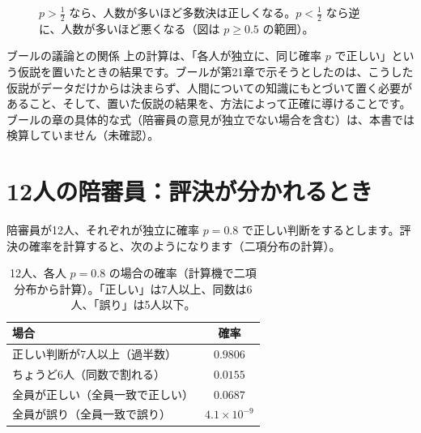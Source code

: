\documentclass[a4paper,11pt,openany]{ltjsbook}
\begin{document}
\begin{figure}[htbp]
\centering
{}
\caption{$p>\tfrac12$ なら、人数が多いほど多数決は正しくなる。$p<\tfrac12$ なら逆に、人数が多いほど悪くなる（図は $p\ge0.5$ の範囲）。}
\end{figure}

\begin{notebox}{ブールの議論との関係}
上の計算は、「各人が独立に、同じ確率 $p$ で正しい」という仮説を置いたときの結果です。ブールが第21章で示そうとしたのは、こうした仮説がデータだけからは決まらず、人間についての知識にもとづいて置く必要があること、そして、置いた仮説の結果を、方法によって正確に導けることです。ブールの章の具体的な式（陪審員の意見が独立でない場合を含む）は、本書では検算していません（未確認）。
\end{notebox}

\section{12人の陪審員：評決が分かれるとき}

陪審員が12人、それぞれが独立に確率 $p=0.8$ で正しい判断をするとします。評決の確率を計算すると、次のようになります（二項分布の計算）。

\begin{table}[htbp]
\centering
\begin{tabular}{lc}
\toprule
場合 & 確率\\
\midrule
正しい判断が7人以上（過半数） & $0.9806$\\
ちょうど6人（同数で割れる） & $0.0155$\\
全員が正しい（全員一致で正しい） & $0.0687$\\
全員が誤り（全員一致で誤り） & $4.1\times10^{-9}$\\
\bottomrule
\end{tabular}
\caption{12人、各人 $p=0.8$ の場合の確率（計算機で二項分布から計算）。「正しい」は7人以上、同数は6人、「誤り」は5人以下。}
\end{table}
\end{document}
